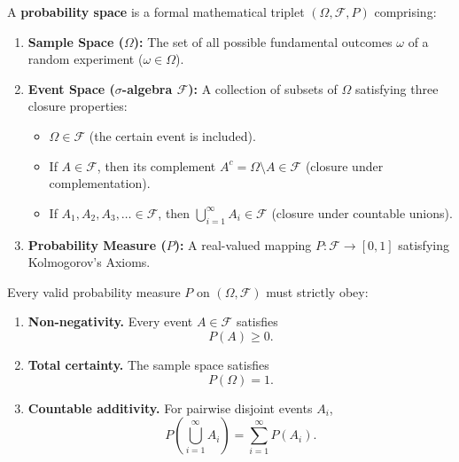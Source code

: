 \documentclass[12pt,a4paper]{article}
\begin{document}
\begin{tcolorbox}[defbox, title={\textbf{Definition: Probability Space $(\Omega, \mathcal{F}, P)$}}]
A \textbf{probability space} is a formal mathematical triplet $(\Omega, \mathcal{F}, P)$ comprising:
\begin{enumerate}[leftmargin=*, itemsep=2pt, topsep=2pt]
  \item \textbf{Sample Space ($\Omega$):} The set of all possible fundamental outcomes $\omega$ of a random experiment ($\omega \in \Omega$).
  \item \textbf{Event Space ($\sigma$-algebra $\mathcal{F}$):} A collection of subsets of $\Omega$ satisfying three closure properties:
  \begin{itemize}[leftmargin=*, itemsep=1pt]
    \item $\Omega \in \mathcal{F}$ (the certain event is included).
    \item If $A \in \mathcal{F}$, then its complement $A^c = \Omega \setminus A \in \mathcal{F}$ (closure under complementation).
    \item If $A_1, A_2, A_3, \dots \in \mathcal{F}$, then $\bigcup_{i=1}^\infty A_i \in \mathcal{F}$ (closure under countable unions).
  \end{itemize}
  \item \textbf{Probability Measure ($P$):} A real-valued mapping $P: \mathcal{F} \to [0, 1]$ satisfying Kolmogorov's Axioms.
\end{enumerate}
\end{tcolorbox}

\begin{tcolorbox}[formulabox, title={\textbf{Kolmogorov's Axioms of Probability}}]
Every valid probability measure $P$ on $(\Omega, \mathcal{F})$ must strictly obey:
\begin{enumerate}[leftmargin=*, itemsep=4pt]
  \item \textbf{Non-negativity.} Every event $A \in \mathcal{F}$ satisfies
  \begin{equation}
    P(A) \ge 0.
  \end{equation}
  \item \textbf{Total certainty.} The sample space satisfies
  \begin{equation}
    P(\Omega) = 1.
  \end{equation}
  \item \textbf{Countable additivity.} For pairwise disjoint events $A_i$,
  \begin{equation}
    P\left(\bigcup_{i=1}^{\infty} A_i\right) = \sum_{i=1}^{\infty} P(A_i).
  \end{equation}
\end{enumerate}
\end{tcolorbox}
\end{document}

